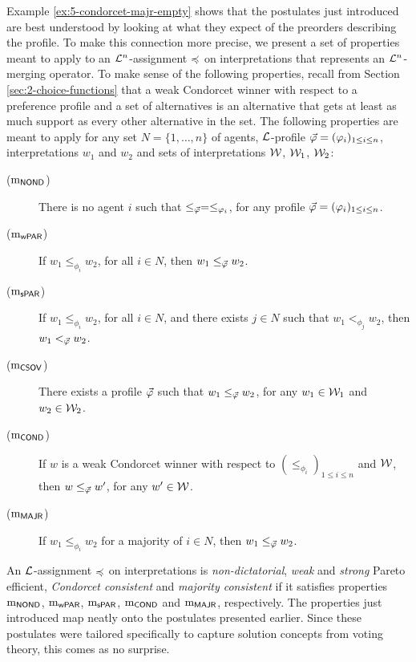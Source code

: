 Example \ref{ex:5-condorcet-majr-empty} shows that 
the postulates just introduced are best understood
by looking at what they expect of the preorders describing the profile.
To make this connection more precise, we present a set of 
properties meant to apply to an $\L^n$-assignment $\as$ on interpretations
that represents an $\L^{n}$-merging operator.
To make sense of the following properties, 
recall from Section \ref{sec:2-choice-functions} that a weak Condorcet winner
with respect to a preference profile and a set of alternatives is an alternative that
gets at least as much support as every other alternative in the set.
The following properties are meant to apply for any 
set $N=\{1,\dots, n\}$ of agents, $\L$-profile $\P=(\phi_i)_{1\le i \le n}$,
interpretations $w_1$ and $w_2$
and sets of interpretations $\W$, $\W_1$, $\W_2$:

\begin{description}
	\item[($\oom{\NOND}$)] There is no agent $i$ such that $\le_{\P}=\le_{\phi_i}$,
		for any profile $\P=(\phi_i)_{1\le i \le n}$.	
	\item[($\oom{\WPRT}$)] If $w_{1}\le_{\phi_i}w_2$, for all $i\in N$, then $w_1 \le_{\P} w_2$.
	\item[($\oom{\SPRT}$)] If $w_{1}\le_{\phi_i}w_2$, for all $i\in N$, 
	and there exists $j\in N$ such that $w_1<_{\phi_j}w_2$, then $w_1 <_{\P} w_2$.
	\item[($\oom{\CSOV}$)] There exists a profile $\P$ such that $w_1\le_{\P}w_2$,
	for any $w_1\in\W_1$ and $w_2\in\W_2$.
	\item[($\oom{\COND}$)] If $w$ is a weak Condorcet winner with respect to $(\le_{\phi_i})_{1\le i\le n}$ and $\W$, 
		then $w\le_\P w'$, for any $w'\in\W$.
	\item[($\oom{\MAJR}$)] If $w_1\le_{\phi_i}w_2$ for a majority of $i\in N$,
		then $w_1\le_{\P}w_2$.
\end{description}

An $\L$-assignment $\as$ on interpretations 
is \emph{non-dictatorial}, \emph{weak} and \emph{strong} Pareto efficient, 
\emph{Condorcet consistent} and \emph{majority consistent} if it satisfies 
properties $\oom{\NOND}$, $\oom{\WPRT}$, $\oom{\SPRT}$, $\oom{\COND}$ and $\oom{\MAJR}$,
respectively.
The properties just introduced map neatly onto the postulates presented earlier.
Since these postulates were tailored specifically to capture solution concepts
from voting theory, this comes as no surprise.

